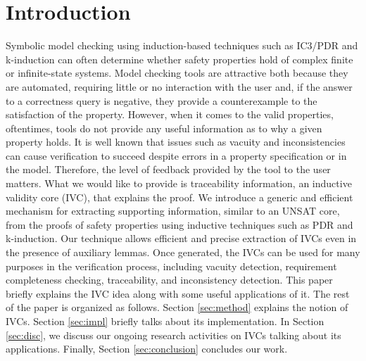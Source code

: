 \section{Introduction}
\label{sec:intro}

Symbolic model checking using induction-based techniques such as IC3/PDR and k-induction can often determine whether safety properties hold of complex finite or infinite-state systems.  Model checking tools are attractive both because they are automated, requiring little or no interaction with the user and, if the answer to a correctness query is negative, they provide a counterexample to the satisfaction of the property.  However, when it comes to the valid properties, oftentimes, tools do not provide any useful information as to why a given property holds. It is well known that issues such as vacuity and inconsistencies can cause verification to succeed despite errors in a property specification or in the model. Therefore, the level of feedback provided by the tool to the user matters. What we would like to provide is traceability information, an inductive validity core (IVC), that explains the proof. We introduce a generic and efficient mechanism for extracting supporting information, similar to an UNSAT core, from the proofs of safety properties using inductive techniques such as PDR and k-induction. Our technique allows efficient and precise extraction of IVCs even in the presence of auxiliary lemmas.
Once generated, the IVCs can be used for many purposes in the verification process, including vacuity detection, requirement completeness checking, traceability, and inconsistency detection. This paper briefly explains the IVC idea along with some useful applications of it. The rest of the paper is organized as follows. Section \ref{sec:method} explains the notion of IVCs. Section \ref{sec:impl} briefly talks about its implementation. In Section \ref{sec:disc}, we discuss our ongoing research activities on IVCs talking about its applications. Finally, Section \ref{sec:conclusion} concludes our work.

